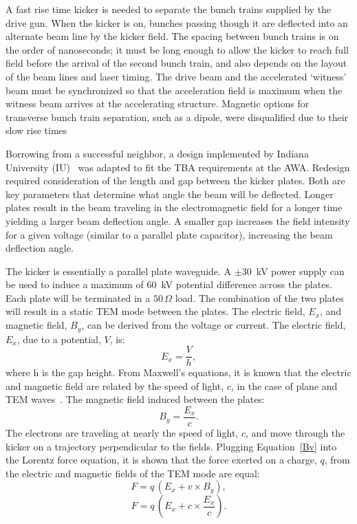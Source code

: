 \documentclass[aps,prab,preprint,groupedaddress,linenumbers]{revtex4-2}
\begin{document}
A fast rise time kicker is needed to separate the 
bunch trains supplied by the drive gun.  When the kicker is on, 
bunches passing though it are deflected into an alternate beam line by the kicker field.
The spacing between bunch trains is on the order of nanoseconds; 
it must be long enough to allow the kicker to reach full field before the arrival of the second bunch train, 
and also depends on the layout of the beam lines and laser timing.  
The drive beam and the accelerated `witness' beam must be synchronized so that the 
acceleration field is maximum when the witness beam arrives at the accelerating structure.
Magnetic options for transverse bunch train separation, 
such as a dipole, were disqualified due to their slow rise times 

Borrowing from a successful neighbor, a design implemented by Indiana University (IU)~\cite{iukicker}
was adapted to fit the TBA requirements at the AWA. Redesign required consideration
of the length and gap between the kicker plates. Both are key parameters that determine 
what angle the beam will be deflected. Longer plates result in the beam traveling 
in the electromagnetic field for a longer time yielding a larger beam deflection angle. 
A smaller gap increases the field intensity for a given voltage (similar to a parallel plate 
capacitor), increasing the beam deflection angle. 


The kicker is essentially a parallel plate waveguide. 
A $\pm$\SI{30}{kV} power supply can be used to induce a maximum of \SI{60}{kV} potential difference 
across the plates. Each plate will be terminated in a $50\,\Omega$ load.  
The combination of the two plates will result in a static TEM mode 
between the plates. The electric field, $E_x$, and magnetic field, $B_y$,
can be derived from the voltage or current. The electric field, $E_x$, due to a potential, $V$, is: 
\begin{equation}
E_x=\frac{V}{h},
\end{equation}
where h is the gap height. From Maxwell's equations, it is known that the electric and magnetic 
field are related by the speed of light, $c$, in the case of plane and TEM waves~\cite{pozar}. 
The magnetic field induced between the plates: 
\begin{equation}
B_y=\frac{E_x}{c}.
\label{Bv}
\end{equation}
The electrons are traveling at nearly the speed of light, $c$, and move through the kicker on a 
trajectory perpendicular to the fields.  Plugging Equation~\ref{Bv} into the Lorentz force equation, 
it is shown that the force exerted on a charge, $q$, 
from the electric and magnetic fields of the TEM mode are equal: 
\begin{equation}
F=q\,(E_x+v\times B_y),
\end{equation}
\begin{equation}
F = q \,\left(E_x+c\times \frac{E_x}{c}\right).
\end{equation}
\end{document}
